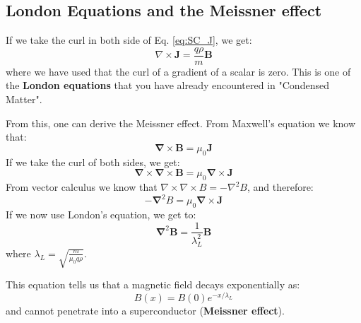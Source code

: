 \documentclass[a4paper,11pt]{article}
\begin{document}
\subsection {London Equations and the Meissner effect}
If we take the curl in both side of Eq. \ref{eq:SC_J}, we get:
\begin{equation}
    \nabla \times \mathbf{J} = \frac{q \rho}{m} \mathbf{B}
\end{equation}
where we have used that the curl of a gradient of a scalar is zero. This is one of the {\bf London equations} that you have already encountered in "Condensed Matter".

From this, one can derive the Meissner effect. From Maxwell's equation we know that:
\begin{equation}
    \mathbf{\nabla} \times \mathbf{B} = \mu_0 \mathbf{J}
\end{equation}
If we take the curl of both sides, we get:
\begin{equation}
    \mathbf{\nabla} \times \mathbf{\nabla} \times \mathbf{B} = \mu_0 \mathbf{\nabla} \times \mathbf{J}
\end{equation}
From vector calculus we know that $\nabla \times \nabla \times B = -\nabla^2 B$, and therefore:
\begin{equation}
    -\mathbf{\nabla}^2 B = \mu_0 \mathbf{\nabla} \times \mathbf{J}
\end{equation}
If we now use London's equation, we get to:
\begin{equation}
    \mathbf{\nabla}^2 \mathbf{B} = \frac{1}{\lambda_L^2} \mathbf{B}
\end{equation}
where $\lambda_L = \sqrt{\frac{m}{\mu_0 q \rho}}$.

This equation tells us that a magnetic field decays exponentially as:
\begin{equation}
    B(x) = B(0)e^{-x/\lambda_L}
\end{equation}
and cannot penetrate into a superconductor ({\bf Meissner effect}).
\end{document}

